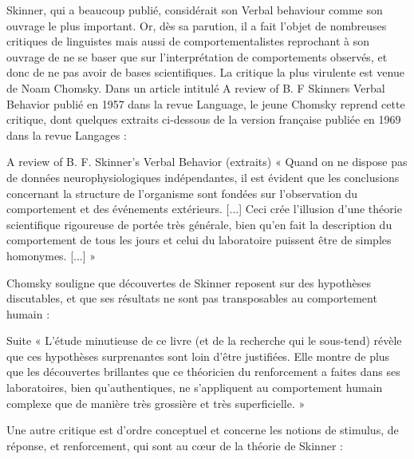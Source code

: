 

Skinner, qui a beaucoup publié, considérait son Verbal behaviour comme son ouvrage le plus important. Or, dès sa parution, il a fait l’objet de nombreuses critiques de linguistes mais aussi de comportementalistes reprochant à son ouvrage de ne se baser que sur l’interprétation de comportements observés, et donc de ne pas avoir de bases scientifiques. La critique la plus virulente est venue de Noam Chomsky. Dans un article intitulé A review of B. F Skinners Verbal Behavior publié en 1957 dans la revue Language, le jeune Chomsky reprend cette critique, dont quelques extraits ci-dessous de la version française publiée en 1969 dans la revue Langages :\par

\begin{lecture}{A review of B. F. Skinner’s Verbal Behavior (extraits)}
« Quand on ne dispose pas de données neurophysiologiques indépendantes, il est évident que les conclusions concernant la structure de l’organisme sont fondées sur l’observation du comportement et des événements extérieurs. [...] Ceci crée l’illusion d’une théorie scientifique rigoureuse de portée très générale, bien qu’en fait la description du comportement de tous les jours et celui du laboratoire puissent être de simples homonymes. [...] »
\end{lecture}

Chomsky souligne que découvertes de Skinner reposent sur des hypothèses discutables, et que ses résultats ne sont pas transposables au comportement humain :\par

\begin{lecture}{Suite}
« L’étude minutieuse de ce livre (et de la recherche qui le sous-tend) révèle que ces hypothèses surprenantes sont loin d’être justifiées. Elle montre de plus que les découvertes brillantes que ce théoricien du renforcement a faites dans ses laboratoires, bien qu’authentiques, ne s’appliquent au comportement humain complexe que de manière très grossière et très superficielle. »
\end{lecture}

Une autre critique est d’ordre conceptuel et concerne les notions de stimulus, de réponse, et renforcement, qui sont au cœur de la théorie de Skinner :\par

